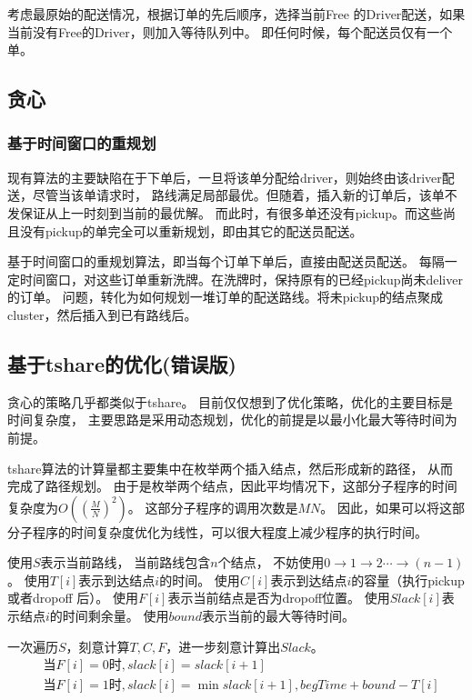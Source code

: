 \documentclass[hyperref,UTF8]{ctexart}
\theoremstyle{definition}
\theoremstyle{remark}
\numberwithin{equation}{subsection}
\begin{document}
考虑最原始的配送情况，根据订单的先后顺序，选择当前Free 的Driver配送，如果当前没有Free的Driver，则加入等待队列中。
即任何时候，每个配送员仅有一个单。	

\subsection{贪心}
\label{subsec:greedy}

\subsubsection{基于时间窗口的重规划}

现有算法的主要缺陷在于下单后，一旦将该单分配给driver，则始终由该driver配送，尽管当该单请求时，
路线满足局部最优。但随着，插入新的订单后，该单不发保证从上一时刻到当前的最优解。
而此时，有很多单还没有pickup。而这些尚且没有pickup的单完全可以重新规划，即由其它的配送员配送。

基于时间窗口的重规划算法，即当每个订单下单后，直接由配送员配送。
每隔一定时间窗口，对这些订单重新洗牌。在洗牌时，保持原有的已经pickup尚未deliver的订单。
问题，转化为如何规划一堆订单的配送路线。将未pickup的结点聚成cluster，然后插入到已有路线后。

\subsection{基于tshare的优化(错误版)}

贪心的策略几乎都类似于tshare。
目前仅仅想到了优化策略，优化的主要目标是时间复杂度，
主要思路是采用动态规划，优化的前提是以最小化最大等待时间为前提。

tshare算法的计算量都主要集中在枚举两个插入结点，然后形成新的路径，
从而完成了路径规划。
由于是枚举两个结点，因此平均情况下，这部分子程序的时间复杂度为$O((\frac{M}{N})^2)$。
这部分子程序的调用次数是$MN$。
因此，如果可以将这部分子程序的时间复杂度优化为线性，可以很大程度上减少程序的执行时间。

使用$S$表示当前路线，
当前路线包含$n$个结点，
不妨使用$0 \rightarrow 1 \rightarrow 2 \cdots \rightarrow (n-1)$。
使用$T[i]$表示到达结点$i$的时间。
使用$C[i]$表示到达结点$i$的容量（执行pickup或者dropoff 后）。
使用$F[i]$表示当前结点是否为dropoff位置。
使用$Slack[i]$表示结点$i$的时间剩余量。
使用$bound$表示当前的最大等待时间。

一次遍历$S$，刻意计算$T,C,F$，进一步刻意计算出$Slack$。
\begin{align*}
	&\text{当} F[i]=0 \text{时}, slack[i] = slack[i+1]	\\
	&\text{当} F[i]=1 \text{时}, slack[i] = \min{slack[i+1], begTime+bound-T[i]}
\end{align*}
\end{document}
